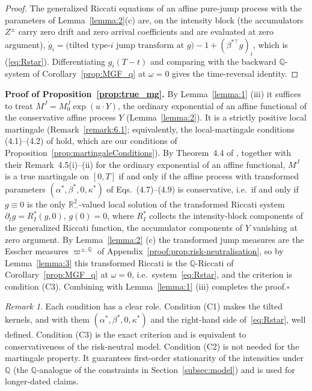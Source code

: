 \documentclass[11pt,a4paper]{article}
\numberwithin{equation}{section}
\theoremstyle{remark}
\newtheorem{remark}[theorem]{Remark}
\theoremstyle{definition}
\providecommand{\R}{{\mathbb{R}}}
\newcommand{\q}{{\mathbb Q}}
\begin{document}
{\begin{proof}
The generalized Riccati equations of an affine pure-jump process with the parameters of Lemma~\ref{lemma:2}(c) are, on the intensity block (the accumulators $Z^{\pm}$ carry zero drift and zero arrival coefficients and are evaluated at zero argument), $\dot g_i=\big(\text{tilted type-}i\text{ jump transform at }g\big)-1+(\beta^{*\top}g)_i$, which is (\ref{eq:Rstar}). Differentiating $g_i(T-t)$ and comparing with the backward $\q$-system of Corollary~\ref{prop:MGF_q} at $\omega=0$ gives the time-reversal identity.
\end{proof}

\medskip
\noindent\textbf{Proof of Proposition~\ref{prop:true_mg}.}
By Lemma~\ref{lemma:1} (iii) it suffices to treat
$M^{J}=M^{J}_0\exp(u\cdot Y)$, the ordinary exponential of an affine
functional of the conservative affine process $Y$
(Lemma~\ref{lemma:2}).
It is a strictly positive local martingale (Remark~\ref{remark:6.1};
equivalently, the local-martingale conditions (4.1)--(4.2) of \cite{Mayerhofer2011} hold, which are our conditions of Proposition~\ref{prop:martingaleConditions}).
By Theorem~4.4 of \cite{Mayerhofer2011}, together with their Remark~4.5(i)--(ii) for the ordinary exponential of an affine functional, $M^{J}$ is a true martingale on $[0,T]$ if and only if the affine process with transformed parameters $(\alpha^{*},\beta^{*},0,\kappa^{*})$ of Eqs.~(4.7)--(4.9) is conservative, i.e.\ if and only if $g\equiv0$ is the only $\R^{2}_{-}$-valued local solution of the transformed Riccati system $\partial_t g=R^{*}_{I}(g,0)$, $g(0)=0$, where $R^{*}_{I}$ collects the intensity-block components of the generalized Riccati function, the accumulator components of $Y$ vanishing at zero argument.
By Lemma~\ref{lemma:2} (c) the transformed jump measures are the Esscher measures $\varpi^{\pm,\q}$ of Appendix~\ref{proof:prop:risk-neutralisation}, so by Lemma~\ref{lemma:3} this transformed Riccati is the $\q$-Riccati of Corollary~\ref{prop:MGF_q} at $\omega=0$, i.e.\ system~\eqref{eq:Rstar}, and the criterion is condition (C3). Combining with Lemma~\ref{lemma:1} (iii) completes the proof.\hfill$\square$

\begin{remark}
  \label{remark:6.2}
Each condition has a clear role. Condition \textup{(C1)} makes the
tilted kernels, and with them $(\alpha^{*},\beta^{*},0,\kappa^{*})$ and
the right-hand side of~\eqref{eq:Rstar}, well defined. Condition
\textup{(C3)} is the exact \cite{Mayerhofer2011} criterion and is
equivalent to conservativeness of the risk-neutral model. Condition
\textup{(C2)} is not needed for the martingale property. It guarantees
first-order stationarity of the intensities under $\q$ (the
$\q$-analogue of the constraints in Section~\ref{subsec:model}) and is
used for longer-dated claims.
\end{remark}

}
\end{document}
